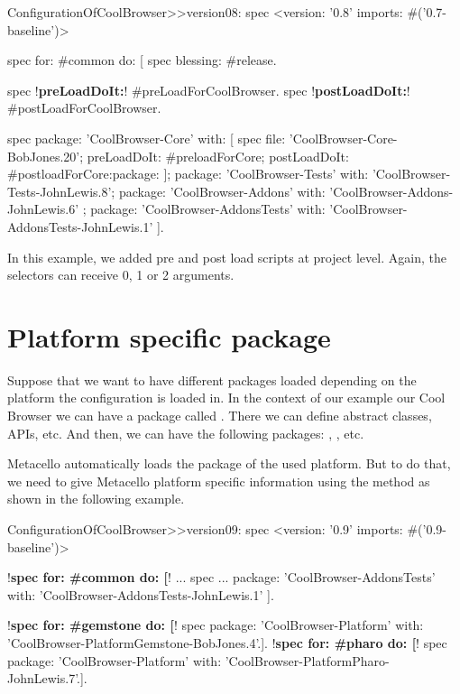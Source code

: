 \documentclass[a4paper,10pt,twoside]{book}
\begin{document}
\begin{code}{} 
ConfigurationOfCoolBrowser>>version08: spec 
       <version: '0.8' imports: #('0.7-baseline')>
       
       spec for: #common do: [
              spec blessing: #release.
              
              spec !\textbf{preLoadDoIt:}! #preLoadForCoolBrowser.
              spec !\textbf{postLoadDoIt:}! #postLoadForCoolBrowser.
       
              spec 
                     package: 'CoolBrowser-Core' with: [
                            spec 
                                   file: 'CoolBrowser-Core-BobJones.20';
                                   preLoadDoIt: #preloadForCore;
                                   postLoadDoIt: #postloadForCore:package: ];
                     package: 'CoolBrowser-Tests' with: 'CoolBrowser-Tests-JohnLewis.8';
                     package: 'CoolBrowser-Addons' with: 'CoolBrowser-Addons-JohnLewis.6' ;
                     package: 'CoolBrowser-AddonsTests' with: 'CoolBrowser-AddonsTests-JohnLewis.1' ].
\end{code}

In this example, we added pre and post load scripts at project level. Again, the selectors can receive 0, 1 or 2 arguments. 


\section {Platform specific package}

Suppose that we want to have different packages loaded depending on the platform the configuration is loaded in. In the context of our example our Cool Browser we can have a package called . There we can define abstract classes, APIs, etc. And then, we can have the following packages: , , etc.

Metacello automatically loads the package of the used platform. But to do that, we need to give Metacello platform specific information using the method  as shown in the following example.

\begin{code}{} 
ConfigurationOfCoolBrowser>>version09: spec 
       <version: '0.9' imports: #('0.9-baseline')>
       
       !\textbf{spec for: \#common do: [}!
              ...
              spec 
                 ...
                     package: 'CoolBrowser-AddonsTests' with: 'CoolBrowser-AddonsTests-JohnLewis.1' ].
       
       !\textbf{spec for: \#gemstone do: [}!
              spec package: 'CoolBrowser-Platform' with: 'CoolBrowser-PlatformGemstone-BobJones.4'.].
       !\textbf{spec for: \#pharo do: [}!
              spec package: 'CoolBrowser-Platform' with: 'CoolBrowser-PlatformPharo-JohnLewis.7'.].
\end{code}
\end{document}
